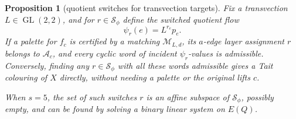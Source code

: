 \documentclass[11pt,a4paper]{article}
\newtheorem{proposition}[theorem]{Proposition}
\theoremstyle{definition}
\theoremstyle{remark}
\begin{document}
\begin{proposition}[quotient switches for transvection targets]\label{prop:quotient-switch}
Fix a transvection $L\in\operatorname{GL}(2,2)$, and for $r\in\mathcal S_\phi$ define the switched quotient flow
\[
 \psi_r(e)=L^{r_e}p_e.
\]
If a palette for $f_c$ is certified by a matching $\mathcal M_{L,d}$, its $a$-edge layer assignment $r$ belongs to $\mathcal A_c$, and every cyclic word of incident $\psi_r$-values is admissible.  Conversely, finding any $r\in\mathcal S_\phi$ with all these words admissible gives a Tait colouring of $X$ directly, without needing a palette or the original lifts $c$.

When $s=5$, the set of such switches $r$ is an affine subspace of $\mathcal S_\phi$, possibly empty, and can be found by solving a binary linear system on $E(Q)$.
\end{proposition}
\end{document}
